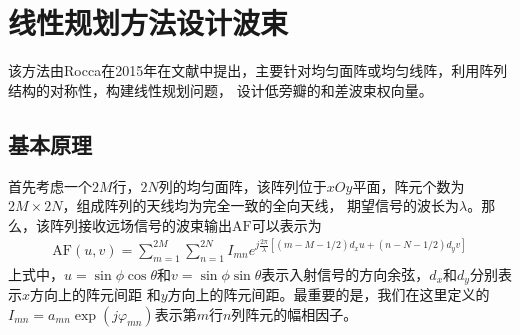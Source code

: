 \documentclass[master]{thesis-uestc}
\begin{document}
\section{线性规划方法设计波束}
该方法由Rocca在2015年在文献\cite{Rocca}中提出，主要针对均匀面阵或均匀线阵，利用阵列结构的对称性，构建线性规划问题，
设计低旁瓣的和差波束权向量。

\subsection{基本原理}
首先考虑一个$2M$行，$2N$列的均匀面阵，该阵列位于$xOy$平面，阵元个数为$2M\times2N$，组成阵列的天线均为完全一致的全向天线，
期望信号的波长为$\lambda$。那么，该阵列接收远场信号的波束输出$\text{AF}$可以表示为
\begin{equation}
    \begin{aligned}
        \text{AF}(u,v) = \sum_{m=1}^{2M}\sum_{n=1}^{2N}I_{mn}
        e^{j\frac{2\pi}{\lambda}\left[\left(m-M-1/2\right)d_xu+\left(n-N-1/2\right)d_yv\right]}
    \end{aligned}
\end{equation}
上式中，$u=\sin\phi\cos\theta$和$v=\sin\phi\sin\theta$表示入射信号的方向余弦，$d_x$和$d_y$分别表示$x$方向上的阵元间距
和$y$方向上的阵元间距。最重要的是，我们在这里定义的$I_{mn}=a_{mn}\exp(j\varphi_{mn})$表示第$m$行$n$列阵元的幅相因子。
\end{document}
